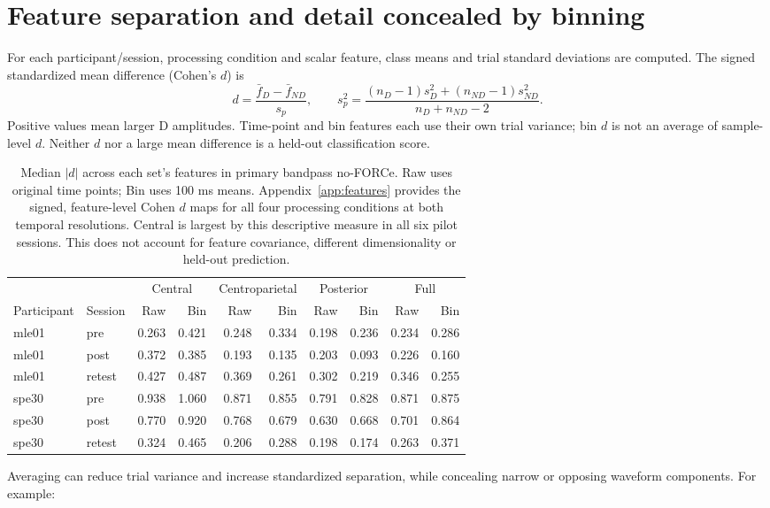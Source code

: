 \documentclass[11pt,a4paper]{article}
\begin{document}
\section{Feature separation and detail concealed by binning}
For each participant/session, processing condition and scalar feature, class means and trial standard deviations are computed. The signed standardized mean difference (Cohen's $d$) is
\[
d=\frac{\bar f_D-\bar f_{ND}}{s_p},\qquad
s_p^2=\frac{(n_D-1)s_D^2+(n_{ND}-1)s_{ND}^2}{n_D+n_{ND}-2}.
\]
Positive values mean larger D amplitudes. Time-point and bin features each use their own trial variance; bin $d$ is not an average of sample-level $d$. Neither $d$ nor a large mean difference is a held-out classification score.
\begin{table}[H]\centering\small\setlength{\tabcolsep}{3.7pt}
\begin{tabular}{@{}llrrrrrrrr@{}}\toprule
 & & \multicolumn{2}{c}{Central} & \multicolumn{2}{c}{Centroparietal} & \multicolumn{2}{c}{Posterior} & \multicolumn{2}{c}{Full}\\
Participant & Session & Raw & Bin & Raw & Bin & Raw & Bin & Raw & Bin\\\midrule
mle01 & pre & 0.263 & 0.421 & 0.248 & 0.334 & 0.198 & 0.236 & 0.234 & 0.286 \\
mle01 & post & 0.372 & 0.385 & 0.193 & 0.135 & 0.203 & 0.093 & 0.226 & 0.160 \\
mle01 & retest & 0.427 & 0.487 & 0.369 & 0.261 & 0.302 & 0.219 & 0.346 & 0.255 \\
spe30 & pre & 0.938 & 1.060 & 0.871 & 0.855 & 0.791 & 0.828 & 0.871 & 0.875 \\
spe30 & post & 0.770 & 0.920 & 0.768 & 0.679 & 0.630 & 0.668 & 0.701 & 0.864 \\
spe30 & retest & 0.324 & 0.465 & 0.206 & 0.288 & 0.198 & 0.174 & 0.263 & 0.371 \\
\bottomrule\end{tabular}
\caption{Median $|d|$ across each set's features in primary bandpass no-FORCe. Raw uses original time points; Bin uses 100 ms means. Appendix~\ref{app:features} provides the signed, feature-level Cohen $d$ maps for all four processing conditions at both temporal resolutions. Central is largest by this descriptive measure in all six pilot sessions. This does not account for feature covariance, different dimensionality or held-out prediction.}\label{tab:separation}
\end{table}
Averaging can reduce trial variance and increase standardized separation, while concealing narrow or opposing waveform components. For example:
\end{document}
